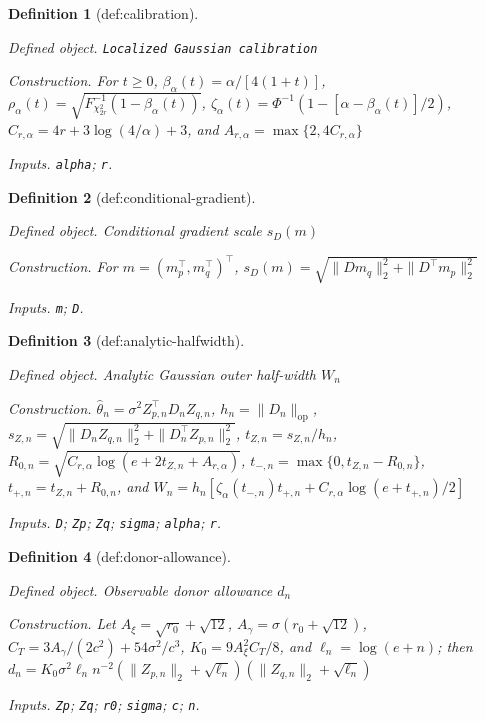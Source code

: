 \documentclass{article}
\newtheorem{definition}{Definition}
\begin{document}
\begin{definition}[def:calibration]\label{def:calibration}
\par\smallskip\noindent\emph{Defined object.} \texttt{Localized Gaussian calibration}
\par\smallskip\noindent\emph{Construction.} For \(t\ge0\), \(\beta_\alpha(t)=\alpha/[4(1+t)]\), \(\rho_\alpha(t)=\sqrt{F^{-1}_{\chi^2_{2r}}(1-\beta_\alpha(t))}\), \(\zeta_\alpha(t)=\Phi^{-1}(1-[\alpha-\beta_\alpha(t)]/2)\), \(C_{r,\alpha}=4r+3\log(4/\alpha)+3\), and \(A_{r,\alpha}=\max\{2,4C_{r,\alpha}\}\)
\par\smallskip\noindent\emph{Inputs.} \texttt{alpha}; \texttt{r}.
\end{definition}

\begin{definition}[def:conditional-gradient]\label{def:conditional-gradient}
\par\smallskip\noindent\emph{Defined object.} Conditional gradient scale \(s_D(m)\)
\par\smallskip\noindent\emph{Construction.} For \(m=(m_p^{\top},m_q^{\top})^{\top}\), \(s_D(m)=\sqrt{\|Dm_q\|_2^2+\|D^{\top}m_p\|_2^2}\)
\par\smallskip\noindent\emph{Inputs.} \texttt{m}; \texttt{D}.
\end{definition}

\begin{definition}[def:analytic-halfwidth]\label{def:analytic-halfwidth}
\par\smallskip\noindent\emph{Defined object.} Analytic Gaussian outer half-width \(W_n\)
\par\smallskip\noindent\emph{Construction.} \(\widehat\theta_n=\sigma^2Z_{p,n}^{\top}D_nZ_{q,n}\), \(h_n=\|D_n\|_{\mathrm{op}}\), \(s_{Z,n}=\sqrt{\|D_nZ_{q,n}\|_2^2+\|D_n^{\top}Z_{p,n}\|_2^2}\), \(t_{Z,n}=s_{Z,n}/h_n\), \(R_{0,n}=\sqrt{C_{r,\alpha}\log(e+2t_{Z,n}+A_{r,\alpha})}\), \(t_{-,n}=\max\{0,t_{Z,n}-R_{0,n}\}\), \(t_{+,n}=t_{Z,n}+R_{0,n}\), and \(W_n=h_n[\zeta_\alpha(t_{-,n})t_{+,n}+C_{r,\alpha}\log(e+t_{+,n})/2]\)
\par\smallskip\noindent\emph{Inputs.} \texttt{D}; \texttt{Zp}; \texttt{Zq}; \texttt{sigma}; \texttt{alpha}; \texttt{r}.
\end{definition}

\begin{definition}[def:donor-allowance]\label{def:donor-allowance}
\par\smallskip\noindent\emph{Defined object.} Observable donor allowance \(d_n\)
\par\smallskip\noindent\emph{Construction.} Let \(A_\xi=\sqrt{r_0}+\sqrt{12}\), \(A_\gamma=\sigma(r_0+\sqrt{12})\), \(C_T=3A_\gamma/(2c^2)+54\sigma^2/c^3\), \(K_0=9A_\xi^2C_T/8\), and \(\ell_n=\log(e+n)\); then \(d_n=K_0\sigma^2\ell_n n^{-2}(\|Z_{p,n}\|_2+\sqrt{\ell_n})(\|Z_{q,n}\|_2+\sqrt{\ell_n})\)
\par\smallskip\noindent\emph{Inputs.} \texttt{Zp}; \texttt{Zq}; \texttt{r0}; \texttt{sigma}; \texttt{c}; \texttt{n}.
\end{definition}
\end{document}
